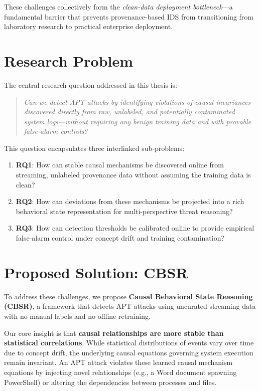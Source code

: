 These challenges collectively form the \textit{clean-data deployment bottleneck}---a
fundamental barrier that prevents provenance-based IDS from transitioning from laboratory
research to practical enterprise deployment.

\section{Research Problem}

The central research question addressed in this thesis is:

\begin{quote}
\textit{Can we detect APT attacks by identifying violations of causal invariances discovered
directly from raw, unlabeled, and potentially contaminated system logs---without requiring any
benign training data and with provable false-alarm controls?}
\end{quote}

This question encapsulates three interlinked sub-problems:
\begin{enumerate}
\item \textbf{RQ1}: How can stable causal mechanisms be discovered online from streaming,
    unlabeled provenance data without assuming the training data is clean?
\item \textbf{RQ2}: How can deviations from these mechanisms be projected into a rich
    behavioral state representation for multi-perspective threat reasoning?
\item \textbf{RQ3}: How can detection thresholds be calibrated online to provide empirical
    false-alarm control under concept drift and training contamination?
\end{enumerate}

\section{Proposed Solution: CBSR}

To address these challenges, we propose \textbf{Causal Behavioral State Reasoning (CBSR)},
a framework that detects APT attacks using uncurated streaming data with no manual labels and
no offline retraining.

Our core insight is that \textbf{causal relationships are more stable than statistical
correlations}. While statistical distributions of events vary over time due to concept drift,
the underlying causal equations governing system execution remain invariant. An APT attack
violates these learned causal mechanism equations by injecting novel relationships (e.g., a
Word document spawning PowerShell) or altering the dependencies between processes and files.

